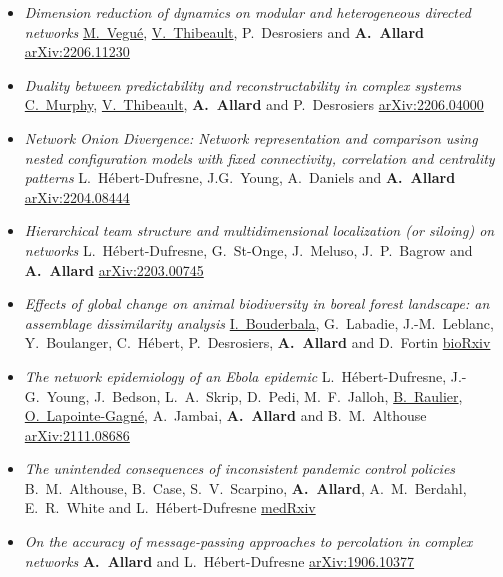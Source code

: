 \documentclass[11pt]{article}
\begin{document}
\begin{itemize}[itemsep=0.5em]\small
%
  \item \textit{Dimension reduction of dynamics on modular and heterogeneous directed networks}\split
  \uline{M.~Vegué}, \uline{V.~Thibeault}, P.~Desrosiers and \textbf{A.~Allard}\split
  \href{https://arxiv.org/abs/2206.11230}{arXiv:2206.11230}
%
  \item \textit{Duality between predictability and reconstructability in complex systems}\split
  \uline{C.~Murphy}, \uline{V.~Thibeault}, \textbf{A.~Allard} and P.~Desrosiers\split
  \href{https://arxiv.org/abs/2206.04000}{arXiv:2206.04000}
%
  \item \textit{Network Onion Divergence: Network representation and comparison using nested configuration models with fixed connectivity, correlation and centrality patterns}\split
  L.~Hébert-Dufresne, J.G.~Young, A.~Daniels and \textbf{A.~Allard}\split
  \href{https://arxiv.org/abs/2204.08444}{arXiv:2204.08444}
%
  \item \textit{Hierarchical team structure and multidimensional localization (or siloing) on networks}\split
  L.~Hébert-Dufresne, G.~St-Onge, J.~Meluso, J.~P.~Bagrow and \textbf{A.~Allard}\split
  \href{https://arxiv.org/abs/2203.00745}{arXiv:2203.00745}
%
  \item \textit{Effects of global change on animal biodiversity in boreal forest landscape: an assemblage dissimilarity analysis}\split
  \uline{I.~Bouderbala}, G.~Labadie, J.-M.~Leblanc, Y.~Boulanger, C.~Hébert, P.~Desrosiers, \textbf{A.~Allard} and D.~Fortin\split
  \href{https://doi.org/10.1101/2022.01.31.477297}{bioRxiv}
%
  \item \textit{The network epidemiology of an Ebola epidemic}\split
  L.~Hébert-Dufresne, J.-G.~Young, J.~Bedson, L.~A.~Skrip, D.~Pedi, M.~F.~Jalloh, \uline{B.~Raulier}, \uline{O.~Lapointe-Gagné}, A.~Jambai, \textbf{A.~Allard} and B.~M.~Althouse\split
  \href{https://arxiv.org/abs/2111.08686}{arXiv:2111.08686}
%
  \item \textit{The unintended consequences of inconsistent pandemic control policies}\split
  B.~M.~Althouse, B.~Case, S.~V.~Scarpino, \textbf{A.~Allard}, A.~M.~Berdahl, E.~R.~White and L.~Hébert-Dufresne\split
  \href{https://doi.org/10.1101/2020.08.21.20179473}{medRxiv}
%
  \item \textit{On the accuracy of message-passing approaches to percolation in complex networks}\split
  \textbf{A.~Allard} and L.~H\'ebert-Dufresne\split
  \href{https://arxiv.org/abs/1906.10377}{arXiv:1906.10377}
%
\end{itemize}
\end{document}
